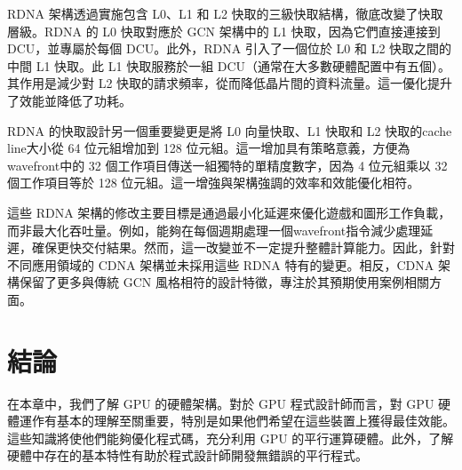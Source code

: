 \vspace{1em}
RDNA 架構透過實施包含 L0、L1 和 L2 快取的三級快取結構，徹底改變了快取層級。RDNA 的 L0 快取對應於 GCN 架構中的 L1 快取，因為它們直接連接到 DCU，並專屬於每個 DCU。此外，RDNA 引入了一個位於 L0 和 L2 快取之間的中間 L1 快取。此 L1 快取服務於一組 DCU（通常在大多數硬體配置中有五個）。其作用是減少對 L2 快取的請求頻率，從而降低晶片間的資料流量。這一優化提升了效能並降低了功耗。

\vspace{1em}
RDNA 的快取設計另一個重要變更是將 L0 向量快取、L1 快取和 L2 快取的cache line大小從 64 位元組增加到 128 位元組。這一增加具有策略意義，方便為wavefront中的 32 個工作項目傳送一組獨特的單精度數字，因為 4 位元組乘以 32 個工作項目等於 128 位元組。這一增強與架構強調的效率和效能優化相符。

\vspace{1em}
這些 RDNA 架構的修改主要目標是通過最小化延遲來優化遊戲和圖形工作負載，而非最大化吞吐量。例如，能夠在每個週期處理一個wavefront指令減少處理延遲，確保更快交付結果。然而，這一改變並不一定提升整體計算能力。因此，針對不同應用領域的 CDNA 架構並未採用這些 RDNA 特有的變更。相反，CDNA 架構保留了更多與傳統 GCN 風格相符的設計特徵，專注於其預期使用案例相關方面。

\section{結論}
在本章中，我們了解 GPU 的硬體架構。對於 GPU 程式設計師而言，對 GPU 硬體運作有基本的理解至關重要，特別是如果他們希望在這些裝置上獲得最佳效能。這些知識將使他們能夠優化程式碼，充分利用 GPU 的平行運算硬體。此外，了解硬體中存在的基本特性有助於程式設計師開發無錯誤的平行程式。
